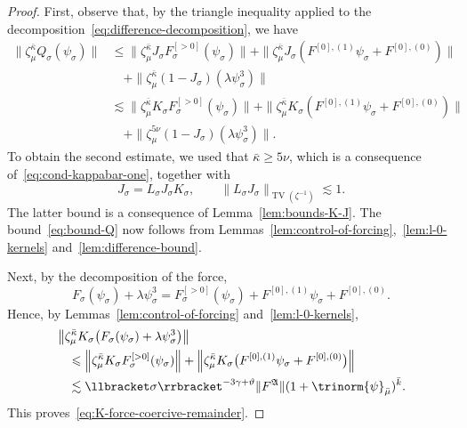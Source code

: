 \documentclass{article}
\numberwithin{equation}{section}
\theoremstyle{plain}
\theoremstyle{definition}
\begin{document}
\begin{proof}
  First, observe that, by the triangle inequality applied to the
  decomposition~\eqref{eq:difference-decomposition}, we have
  \begin{align*}
    \| \zeta_{\mu}^{\bar{\kappa}} Q_{\sigma} (\psi_{\sigma}) \|
    &\leqslant
    \| \zeta_{\mu}^{\bar{\kappa}} J_{\sigma}
    F_{\sigma}^{[> 0]}(\psi_{\sigma}) \|
    + \| \zeta_{\mu}^{\bar{\kappa}} J_{\sigma}
    (F^{[0], (1)} \psi_{\sigma} + F^{[0], (0)}) \|\\
    &\quad + \| \zeta_{\mu}^{\bar{\kappa}}
    (1 - J_{\sigma})(\lambda \psi^3_{\sigma}) \|\\
    &\lesssim
    \| \zeta_{\mu}^{\bar{\kappa}} K_{\sigma}
    F_{\sigma}^{[>0]}(\psi_{\sigma}) \|
    + \| \zeta_{\mu}^{\bar{\kappa}} K_{\sigma}
    (F^{[0], (1)} \psi_{\sigma} + F^{[0], (0)}) \|\\
    &\quad + \| \zeta_{\mu}^{5 \nu}
    (1 - J_{\sigma})(\lambda \psi^3_{\sigma}) \| .
  \end{align*}
  To obtain the second estimate, we used that $\bar{\kappa} \geqslant 5 \nu$,
  which is a consequence of~\eqref{eq:cond-kappabar-one}, together with
  \[
    J_{\sigma} = L_{\sigma} J_{\sigma} K_{\sigma}, \qquad
    \| L_{\sigma} J_{\sigma} \|_{\operatorname{TV} (\zeta^{- 1})}
    \lesssim 1 .
  \]
  The latter bound is a consequence of Lemma~\ref{lem:bounds-K-J}. The
  bound~\eqref{eq:bound-Q} now follows from
  Lemmas~\ref{lem:control-of-forcing},~\ref{lem:l-0-kernels}
  and~\ref{lem:difference-bound}. 
  
  Next, by the decomposition of the force,
  \[
  F_{\sigma}(\psi_{\sigma})+\lambda\psi_{\sigma}^{3}
  =
  F_{\sigma}^{[>0]}(\psi_{\sigma})
  +F^{[0],(1)}\psi_{\sigma}
  +F^{[0],(0)}.
  \]
  Hence, by Lemmas~\ref{lem:control-of-forcing}
  and~\ref{lem:l-0-kernels},
  \begin{align*}
  	&\left\|
  	\zeta_{\mu}^{\bar\kappa}K_{\sigma}
  	\bigl(F_{\sigma}(\psi_{\sigma})
  	+\lambda\psi_{\sigma}^{3}\bigr)
  	\right\|\\
  	&\quad\leqslant
  	\left\|
  	\zeta_{\mu}^{\bar\kappa}K_{\sigma}
  	F_{\sigma}^{[>0]}(\psi_{\sigma})
  	\right\|
  	+
  	\left\|
  	\zeta_{\mu}^{\bar\kappa}K_{\sigma}
  	\bigl(F^{[0],(1)}\psi_{\sigma}
  	+F^{[0],(0)}\bigr)
  	\right\|\\
  	&\quad\lesssim
  	\llbracket\sigma\rrbracket^{-3\gamma+\vartheta}
  	\|F^{\mathfrak A}\|
  	(1+\trinorm{\psi}_{\bar\mu})^{\bar k}.
  \end{align*}
  This proves~\eqref{eq:K-force-coercive-remainder}.


\end{proof}
\end{document}
